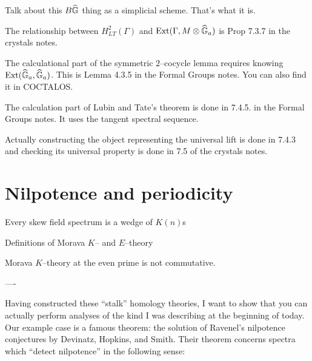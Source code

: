 Talk about this $B\widehat{\mathbb G}$ thing as a simplicial scheme. That's what it is.

The relationship between $H^2_{LT}(\Gamma)$ and $\operatorname{Ext}(\Gamma, M \otimes \widehat{\mathbb G}_a)$ is Prop 7.3.7 in the crystals notes.




The calculational part of the symmetric $2$--cocycle lemma requires knowing $\operatorname{Ext}(\widehat{\mathbb G}_a, \widehat{\mathbb G}_a)$.  This is Lemma 4.3.5 in the Formal Groups notes.  You can also find it in COCTALOS.



The calculation part of Lubin and Tate's theorem is done in 7.4.5. in the Formal Groups notes. It uses the tangent spectral sequence.



Actually constructing the object representing the universal lift is done in 7.4.3 and checking its universal property is done in 7.5 of the crystals notes.









\section{Nilpotence and periodicity}

Every skew field spectrum is a wedge of $K(n)$s

Definitions of Morava $K$-- and $E$--theory

\begin{remark}
Morava $K$--theory at the even prime is not commutative.
\end{remark}

----

Having constructed these ``stalk'' homology theories, I want to show that you can actually perform analyses of the kind I was describing at the beginning of today.  Our example case is a famous theorem: the solution of Ravenel's nilpotence conjectures by Devinatz, Hopkins, and Smith.  Their theorem concerns spectra which ``detect nilpotence'' in the following sense:

